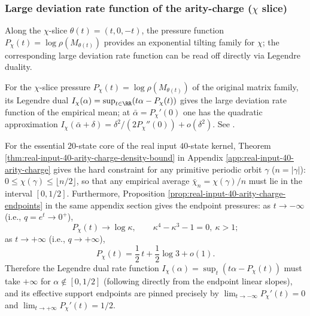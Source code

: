 \subsubsection{Large deviation rate function of the arity-charge (\texorpdfstring{$\chi$}{chi} slice)}\label{subsec:chi-ldp}
Along the $\chi$-slice $\theta(t)=(t,0,-t)$, the pressure function $P_\chi(t)=\log\rho(M_{\theta(t)})$ provides an exponential tilting family for $\chi$; the corresponding large deviation rate function can be read off directly via Legendre duality.

\begin{remark}\label{thm:chi-gartner-ellis}
For the \(\chi\)-slice pressure \(P_\chi(t)=\log\rho(M_{\theta(t)})\) of the original matrix family, its Legendre dual
\(
I_\chi(\alpha)=\sup_{t\in\RR}(t\alpha-P_\chi(t))
\)
gives the large deviation rate function of the empirical mean; at \(\bar\alpha=P_\chi'(0)\) one has the quadratic approximation \(I_\chi(\bar\alpha+\delta)=\delta^2/(2P_\chi''(0))+o(\delta^2)\). See \cite{DemboZeitouni2010LargeDeviations}.
\end{remark}

\begin{remark}\label{rem:chi-ldp-endpoints}
For the essential \(20\)-state core of the real input \(40\)-state kernel, Theorem
\ref{thm:real-input-40-arity-charge-density-bound}
in Appendix \ref{app:real-input-40-arity-charge}
gives the hard constraint for any primitive periodic orbit $\gamma$ ($n=|\gamma|$):
\(
0\le \chi(\gamma)\le \lfloor n/2\rfloor
\), so that any empirical average
\(
\bar\chi_n=\chi(\gamma)/n
\)
must lie in the interval $[0,1/2]$.
Furthermore, Proposition \ref{prop:real-input-40-arity-charge-endpoints} in the same appendix section gives the endpoint pressures:
as $t\to-\infty$ (i.e., $q=e^t\to 0^+$),
\[
P_\chi(t)\to \log\kappa,
\qquad
\kappa^4-\kappa^3-1=0,\ \kappa>1;
\]
as $t\to+\infty$ (i.e., $q\to+\infty$),
\[
P_\chi(t)=\frac12\,t+\frac12\log 3+o(1).
\]
Therefore the Legendre dual rate function $I_\chi(\alpha)=\sup_t(t\alpha-P_\chi(t))$ must take $+\infty$ for $\alpha\notin[0,1/2]$ (following directly from the endpoint linear slopes), and its effective support endpoints are pinned precisely by
\(
\lim_{t\to-\infty}P_\chi'(t)=0
\)
and
\(
\lim_{t\to+\infty}P_\chi'(t)=1/2
\).
\end{remark}

